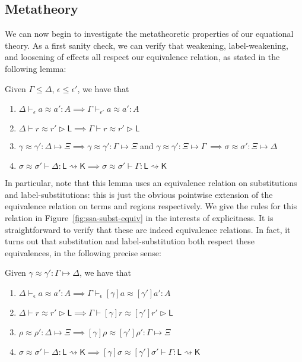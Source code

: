 \documentclass[acmsmall,screen,review]{acmart}
\newcounter{todos}
\newcommand{\todo}[1]{\stepcounter{todos} \textcolor{red}{TODO \arabic{todos}: #1}}
\newcommand{\ms}[1]{\ensuremath{\mathsf{#1}}}
\newcommand{\issubst}[3]{#1: #2 \mapsto #3}
\newcommand{\lbsubst}[4]{#1 \vdash #2: #3 \rightsquigarrow #4}
\newcommand{\teqv}{\approx}
\newcommand{\tmeq}[5]{#1 \vdash_{#2} #3 \teqv #4 : {#5}}
\newcommand{\lbeq}[4]{#1 \vdash #2 \teqv #3 \rhd {#4}}
\newcommand{\tmseq}[4]{\issubst{#1 \teqv #2}{#3}{#4}}
\newcommand{\lbseq}[5]{\lbsubst{#1 \teqv #2}{#3}{#4}{#5}}
\begin{document}
\subsection{Metatheory}

We can now begin to investigate the metatheoretic properties of our equational theory. As a first
sanity check, we can verify that weakening, label-weakening, and loosening of effects all respect
our equivalence relation, as stated in the following lemma:
\begin{lemma}
  Given $\Gamma \leq \Delta$, $\epsilon \leq \epsilon'$, we have that
  \begin{enumerate}[label=(\alph*)]
    \item $\tmeq{\Delta}{\epsilon}{a}{a'}{A} \implies \tmeq{\Gamma}{\epsilon'}{a}{a'}{A}$
    \item $\lbeq{\Delta}{r}{r'}{\ms{L}} \implies \lbeq{\Gamma}{r}{r'}{\ms{L}}$
    \item $\tmseq{\gamma}{\gamma'}{\Delta}{\Xi} 
      \implies \tmseq{\gamma}{\gamma'}{\Gamma}{\Xi}$ and
      $\tmseq{\gamma}{\gamma'}{\Xi}{\Gamma}\
      \implies \tmseq{\sigma}{\sigma'}{\Xi}{\Delta}$
    \item $\lbseq{\sigma}{\sigma'}{\Delta}{\ms{L}}{\ms{K}}
      \implies \lbseq{\sigma}{\sigma'}{\Gamma}{\ms{L}}{\ms{K}}$
  \end{enumerate}
\end{lemma}
In particular, note that this lemma uses an equivalence relation on substitutions and
label-substitutions: this is just the obvious pointwise extension of the equivalence relation on
terms and regions respectively. We give the rules for this relation in
Figure~\ref{fig:ssa-subst-equiv} in the interests of explicitness. It is straightforward to verify
that these are indeed equivalence relations.  In fact, it turns out that substitution and
label-substitution both respect these equivalences, in the following precise sense:
\begin{lemma}
  Given $\tmseq{\gamma}{\gamma'}{\Gamma}{\Delta}$, we have that
  \begin{enumerate}[label=(\alph*)]
    \item $\tmeq{\Delta}{\epsilon}{a}{a'}{A} 
      \implies \tmeq{\Gamma}{\epsilon}{[\gamma]a}{[\gamma']a'}{A}$
    \item $\lbeq{\Delta}{r}{r'}{\ms{L}} 
      \implies \lbeq{\Gamma}{[\gamma]r}{[\gamma']r'}{\ms{L}}$
    \item $\tmseq{\rho}{\rho'}{\Delta}{\Xi}
      \implies \tmseq{[\gamma]\rho}{[\gamma']\rho'}{\Gamma}{\Xi}$
    \item $\lbseq{\sigma}{\sigma'}{\Delta}{\ms{L}}{\ms{K}}
      \implies \lbseq{[\gamma]\sigma}{[\gamma']\sigma'}{\Gamma}{\ms{L}}{\ms{K}}$
  \end{enumerate}
\end{lemma}
\end{document}
